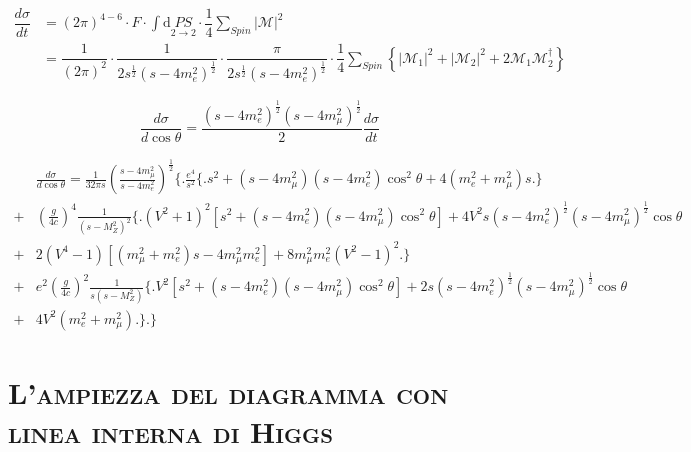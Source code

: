 \documentclass[11pt]{article}
\begin{document}

    \begin{equation}
	\begin{split}
	\dfrac{d\sigma}{dt} & = \left(2\pi\right)^{4-6}\cdot F \cdot \int \mathrm{d}\underset{2\to2}{PS} \cdot \dfrac{1}{4}\sum_{Spin}\lvert\mathcal{M}\rvert^2 \\ 
	 & = \dfrac{1}{\left(2\pi\right)^{2}} \cdot \dfrac{1}{2s^{\frac{1}{2}}(s-4m_e^2)^{\frac{1}{2}} } \cdot \dfrac{\pi}{2s^{\frac{1}{2}}(s-4m_e^2)^{\frac{1}{2}} } \cdot \dfrac{1}{4}\sum_{Spin}\left\{\lvert\mathcal{M}_1\rvert^2+\lvert\mathcal{M}_2\rvert^2+2\mathcal{M}_1\mathcal{M}_2^{\dagger}\right\}
	\end{split}
	\end{equation}

    \begin{equation}
    \frac{d\sigma}{d\cos\theta}=\frac{(s-4m_e^2)^{\frac{1}{2}}(s-4m_\mu^2)^{\frac{1}{2}}}{2}\frac{d\sigma}{dt}
    \end{equation}

    \begin{equation}
    \begin{split}
    &\frac{d\sigma}{d\cos\theta}=\frac{1}{32\pi s}\left(\frac{s-4m_\mu^2}{s-4m_e^2}\right)^{\frac{1}{2}} \Bigg\{ \Bigg. \frac{e^4}{s^2}\Big\{ \Big. s^2+(s-4m_\mu^2)(s-4m_e^2)\cos^2\theta+4(m_e^2+m_\mu^2)s\Big. \Big\} \\
    +&\left(\frac{g}{4c}\right)^4\frac{1}{(s-M_Z^2)^2}\Big\{ \Big. (V^2+1)^2\left[s^2+(s-4m_e^2)(s-4m_\mu^2)\cos^2\theta\right]+4V^2s(s-4m_e^2)^{\frac{1}{2}}(s-4m_\mu^2)^{\frac{1}{2}}\cos\theta\\
    +&2(V^4-1)\left[(m_\mu^2+m_e^2)s-4m_\mu^2 m_e^2\right]+8m_\mu^2 m_e^2(V^2-1)^2 \Big. \Big\}\\
    +&e^2\left(\frac{g}{4c}\right)^2\frac{1}{s(s-M_Z^2)}\Big\{ \Big. V^2\left[ s^2+(s-4m_e^2)(s-4m_\mu^2)\cos^2\theta \right]+2s(s-4m_e^2)^{\frac{1}{2}}(s-4m_\mu^2)^{\frac{1}{2}}\cos\theta\\
    +&4V^2(m_e^2+m_\mu^2) \Big. \Big\}
    \Bigg. \Bigg\}
    \end{split}
    \end{equation}


    \section{\centering\textsc{L'ampiezza del diagramma con linea interna di Higgs} } %
\end{document}
